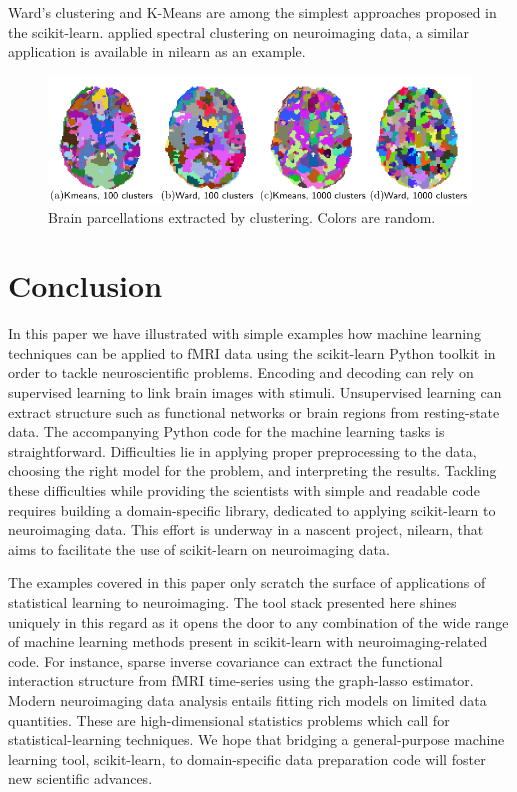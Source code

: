 \documentclass{frontiersSCNS} %
\begin{document}
Ward's clustering and K-Means are among the simplest approaches proposed in the
scikit-learn. \cite{craddock2011} applied spectral clustering on neuroimaging
data, a similar application is available in nilearn as an example.

\begin{figure}[hbtp]
  \includegraphics[width=\linewidth]{scripts/clustering/figure}
  \caption{Brain parcellations extracted by clustering. Colors are
random.}
  \label{fig:clustering}
\end{figure}

\section{Conclusion}

In this paper we have illustrated with simple examples how machine
learning techniques can be applied
to fMRI data using the scikit-learn Python toolkit in order to tackle
neuroscientific problems. Encoding and decoding can rely on supervised
learning to link brain images with stimuli. Unsupervised learning
can extract structure such as functional networks or
brain regions from resting-state data. The accompanying Python code for the machine learning
tasks is straightforward. Difficulties lie in applying proper 
preprocessing to the data, choosing the right model for the problem,
and interpreting the results. Tackling these difficulties while
providing the scientists with simple and readable code requires building
a domain-specific library, dedicated to applying scikit-learn to
neuroimaging data. This effort is underway in a nascent project, nilearn,
that aims to facilitate the use of scikit-learn on neuroimaging data.

The examples covered in this paper only scratch the
surface of applications of statistical learning to neuroimaging.
The tool stack presented here shines uniquely in this regard as it opens the
door to any combination of the wide range of machine learning methods
present in scikit-learn with neuroimaging-related code. For
instance, sparse inverse covariance can extract the functional 
interaction structure from fMRI time-series \citep{varoquaux2013} using
the graph-lasso estimator.
Modern neuroimaging data analysis entails fitting rich models on
limited data quantities. These are high-dimensional statistics problems
which call
for statistical-learning techniques. We hope that bridging a
general-purpose machine learning tool, scikit-learn, to domain-specific
data preparation code will foster new scientific advances.
\end{document}
